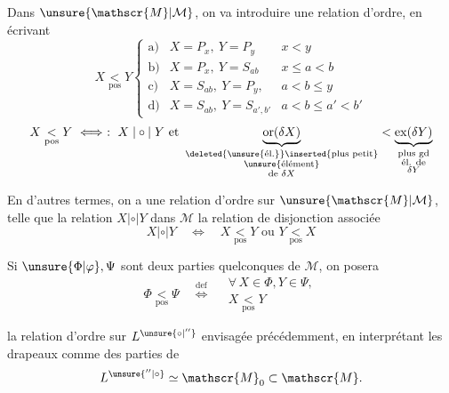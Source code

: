 Dans $\unsure{\mathscr{M}|\mathcal{M}}$, on va introduire une relation d'ordre, en écrivant
\[
X\underset{\mathrm{pos}}{<}Y
\left\{
\begin{array}{lll}
\text{a)}&X=P_x,\ Y=P_y&x<y\\
\text{b)}&X=P_x,\ Y=S_{ab}&x\leq a<b\\
\text{c)}&X=S_{ab},\ Y=P_y,&a<b\leq y\\
\text{d)}&X=S_{ab},\ Y=S_{a',b'}&a<b\leq a'<b'
\end{array}\right.
\]
\[
X\underset{\mathrm{pos}}{<}Y\ \Longleftrightarrow\ :\ X\mathrel{|\circ|}Y\text{ et }
\underbrace{\operatorname{or}(\delta X)}_{\substack{\deleted{\text{\unsure{él.}}}\inserted{\text{plus petit}}\\\text{\unsure{élément}}\\\text{de }\delta X}}
<\underbrace{\operatorname{ex}(\delta Y)}_{\substack{\text{plus gd}\\\text{él. de}\\\delta Y}}
\]


En d'autres termes, on a  une relation d'ordre sur $\unsure{\mathscr{M}|\mathcal{M}}$, telle que la relation $X\mathrel{|\circ|}Y$ dans $\mathscr{M}$  la relation de disjonction  associée
\[
X\mathrel{|\circ|}Y\quad\Longleftrightarrow\quad X\underset{\mathrm{pos}}{<}Y\text{ ou }Y\underset{\mathrm{pos}}{<}X
\]

Si $\unsure{\Phi|\varphi},\Psi$ sont deux parties quelconques de $\mathscr{M}$, on posera
\[
\Phi\underset{\mathrm{pos}}{<}\Psi\quad\overset{\mathrm{def}}{\Longleftrightarrow}\quad
\begin{gathered}
\forall\,X\in\Phi,Y\in\Psi,\\
X\underset{\mathrm{pos}}{<}Y
\end{gathered}
\]

 la relation d'ordre sur $L^{\unsure{\circ|''}}$ envisagée précédemment, en interprétant les drapeaux comme des parties de
\[
L^{\unsure{''|\circ}}\simeq\mathscr{M}_0\subset\mathscr{M}.
\]

